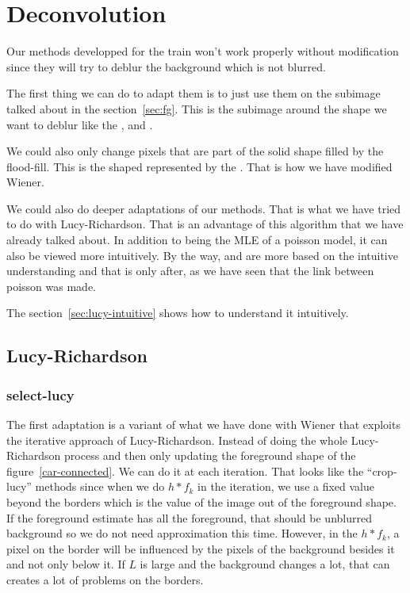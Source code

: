 \section{Deconvolution}
Our methods developped for the train won't work properly
without modification since they will try to deblur the background
which is not blurred.

The first thing we can do to adapt them is to just use them
on the subimage talked about in the section~\ref{sec:fg}.
This is the subimage around the shape we want to deblur
like the ,
 and .

We could also only change pixels that are part of the solid
shape filled by the flood-fill.
This is the shaped represented by the
.
That is how we have modified Wiener.

We could also do deeper adaptations of our methods.
That is what we have tried to do with Lucy-Richardson.
That is an advantage of this algorithm that we have already
talked about.
In addition to being the MLE of a poisson model,
it can also be viewed more intuitively.
By the way,
\cite{richardson1972bayesian} and \cite{lucy1974iterative}
are more based on the intuitive understanding and that is
only after, as we have seen that the link between poisson
was made.

The section~\ref{sec:lucy-intuitive} shows how to understand
it intuitively.

\subsection{Lucy-Richardson}
\subsubsection{select-lucy}
The first adaptation is a variant of what we have done
with Wiener that exploits the iterative approach of Lucy-Richardson.
Instead of doing the whole Lucy-Richardson process and then
only updating the foreground shape of the figure~\ref{car-connected}.
We can do it at each iteration.
That looks like the ``crop-lucy'' methods since when we do
$h * f_k$ in the iteration, we use a fixed value beyond the borders
which is the value of the image out of the foreground shape.
If the foreground estimate has all the foreground,
that should be unblurred background so we do not need approximation
this time.
However, in the $h * f_k$, a pixel on the border will be influenced
by the pixels of the background besides it and not only below it.
If $L$ is large and the background changes a lot, that can
creates a lot of problems on the borders.

